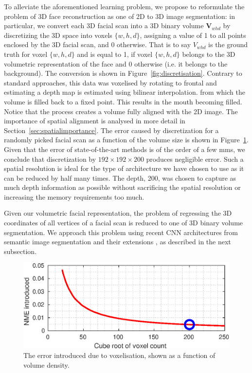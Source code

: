 To alleviate the aforementioned learning problem, we propose to
reformulate the problem of 3D face reconstruction as one of 2D to 3D
image segmentation: in particular, we convert each 3D facial scan into
a 3D binary volume $\mathbf{V}_{whd}$ by discretizing the 3D space
into voxels $\{w,h,d\}$, assigning a value of 1 to all points enclosed
by the 3D facial scan, and 0 otherwise. That is to say $ V_{whd}$ is
the ground truth for voxel $\{w,h,d\}$ and is equal to 1, if voxel
$\{w,h,d\}$ belongs to the 3D volumetric representation of the face
and 0 otherwise (i.e. it belongs to the background). The conversion is
shown in Figure~\ref{fig:discretisation}. Contrary to standard
approaches, this data was voxelised by rotating to frontal and
estimating a depth map is estimated using bilinear interpolation. from
which the volume is filled back to a fixed point. This results in the
mouth becoming filled. Notice that the process creates a volume fully
aligned with the 2D image. The importance of spatial alignment is
analysed in more detail in Section~\ref{sec:spatialimportance}. The
error caused by discretization for a randomly picked facial scan as a
function of the volume size is shown in
Figure~\ref{fig:voxerror}. Given that the error of state-of-the-art
methods \cite{roth2016adaptive,liu2016joint} is of the order of a few
mms, we conclude that discretization by $192\times 192\times 200$
produces negligible error. Such a spatial resolution is ideal for the
type of architecture we have chosen to use as it can be reduced by
half many times. The depth, 200, was chosen to capture as much depth
information as possible without sacrificing the spatial resolution or
increasing the memory requirements too much.

Given our volumetric facial representation, the problem of regressing
the 3D coordinates of all vertices of a facial scan is reduced to one
of 3D binary volume segmentation. We approach this problem using
recent CNN architectures from semantic image segmentation
\cite{long2015fully} and their extensions \cite{newell2016stacked}, as
described in the next subsection.

\begin{figure}
  \centering
  \includegraphics[width=0.9\linewidth]{curves/voxerror.eps}
  \caption[Error due to voxelisation]{The error introduced due to
    voxelisation, shown as a function of volume density.}
  \label{fig:voxerror}
\end{figure}

